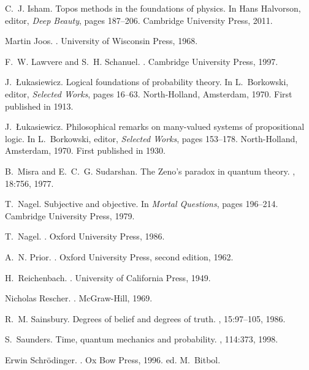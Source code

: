 \documentclass[12pt,a4paper,reqno]{article}
\renewcommand{\(}{\left(}
\renewcommand{\)}{\right)}
\newcommand{\<}{\langle}
\renewcommand{\>}{\rangle}
\theoremstyle{plain} %
\begin{document}
\begin{thebibliography}{10}
C.~J. Isham.
\newblock Topos methods in the foundations of physics.
\newblock In Hans Halvorson, editor, {\em Deep Beauty}, pages 187--206.
  Cambridge University Press, 2011.

Martin Joos.
.
\newblock University of Wisconsin Press, 1968.

F.~W. Lawvere and S.~H. Schanuel.
.
\newblock Cambridge University Press, 1997.

J.~{\L}ukasiewicz.
\newblock Logical foundations of probability theory.
\newblock In L.~Borkowski, editor, {\em Selected Works}, pages 16--63.
  North-Holland, Amsterdam, 1970.
\newblock First published in 1913.

J.~{\L}ukasiewicz.
\newblock Philosophical remarks on many-valued systems of propositional logic.
\newblock In L.~Borkowski, editor, {\em Selected Works}, pages 153--178.
  North-Holland, Amsterdam, 1970.
\newblock First published in 1930.

B.~Misra and E.~C.~G. Sudarshan.
\newblock The {Z}eno's paradox in quantum theory.
, 18:756, 1977.

T.~Nagel.
\newblock Subjective and objective.
\newblock In {\em Mortal Questions}, pages 196--214. Cambridge University
  Press, 1979.

T.~Nagel.
.
\newblock Oxford University Press, 1986.

A.~N. Prior.
.
\newblock Oxford University Press, second edition, 1962.

H.~Reichenbach.
.
\newblock University of California Press, 1949.

Nicholas Rescher.
.
\newblock McGraw-Hill, 1969.

R.~M. Sainsbury.
\newblock Degrees of belief and degrees of truth.
, 15:97--105, 1986.

S.~Saunders.
\newblock Time, quantum mechanics and probability.
, 114:373, 1998.

Erwin Schr{\"o}dinger.
.
\newblock Ox Bow Press, 1996.
\newblock ed. M.~Bitbol.


\end{thebibliography}
\end{document}
